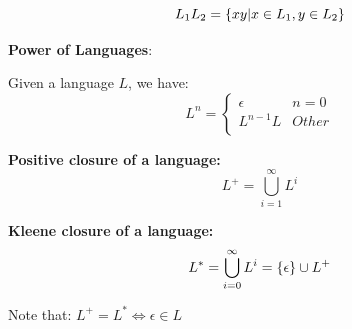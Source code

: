 \documentclass{ctexart}
\DeclarePairedDelimiter{\set}{\{}{\}}
\begin{document}
$$
L_1L_2 = \set*{xy | x \in L_1, y \in L_2 }
$$


\textbf{Power of Languages}:

Given a language $L$, we have:
$$
L^n = \begin{cases}
\epsilon & n=0 \\
L^{n-1}L & Other \\
\end{cases}
$$

\textbf{Positive closure of a language:}
$$
L^+ = \bigcup_{i=1}^{\infty}L^i
$$

\textbf{Kleene closure of a language:}
$$
L^* = \bigcup_{i=0}^{\infty}L^i = \set*{\epsilon} \cup L^+
$$

Note that: $L^+ = L^* \iff \epsilon \in L$

\end{document}
